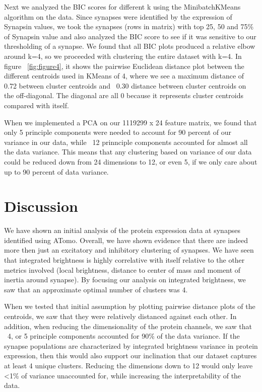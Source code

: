\documentclass{article}
\begin{document}
Next we analyzed the BIC scores for different k using the MinibatchKMeans algorithm on the data. Since synapses were identified by the expression of Synapsin values, we took the synapses (rows in matrix) with top 25, 50 and 75\% of Synapsin value and also analyzed the BIC score to see if it was sensitive to our thresholding of a synapse. We found that all BIC plots produced a relative elbow around k=4, so we proceeded with clustering the entire dataset with k=4. In figure ~\ref{fig:figure4}, it shows the pairwise Euclidean distance plot between the different centroids used in KMeans of 4, where we see a maximum distance of 0.72 between cluster centroids and ~0.30 distance between cluster centroids on the off-diagonal. The diagonal are all 0 because it represents cluster centroids compared with itself. 

When we implemented a PCA on our 1119299 x 24 feature matrix, we found that only 5 principle components were needed to account for 90 percent of our variance in our data, while ~12 prinnciple components accounted for almost all the data variance. This means that any clustering based on variance of our data could be reduced down from 24 dimensions to 12, or even 5, if we only care about up to 90 percent of data variance. 

\section{Discussion}
\label{discussion}
We have shown an initial analysis of the protein expression data at synapses identified using ATomo. Overall, we have shown evidence that there are indeed more then just an excitatory and inhibitory clustering of synapses. We have seen that integrated brightness is highly correlative with itself relative to the other metrics involved (local brightness, distance to center of mass and moment of inertia around synapse). By focusing our analysis on integrated brightness, we saw that an approximate optimal number of clusters was 4.

When we tested that initial assumption by plotting pairwise distance plots of the centroids, we saw that they were relatively distanced against each other. In addition, when reducing the dimensionality of the protein channels, we saw that ~4, or 5 principle components accounted for 90\% of the data variance. If the synapse populations are characterized by integrated brightness variance in protein expression, then this would also support our inclination that our dataset captures at least 4 unique clusters. Reducing the dimensions down to 12 would only leave <1\% of variance unaccounted for, while increasing the interpretability of the data.
\end{document}
